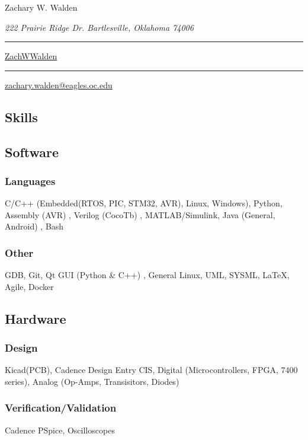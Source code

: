 \documentclass{article}
\newcommand\mybar{\kern1pt\rule[-\dp\strutbox]{.8pt}{\baselineskip}\kern1pt}
\begin{document}
\begin{center}
	\begin{Huge}
		Zachary W. Walden\\
	\end{Huge}
	\begin{large}
		\textsl{222 Prairie Ridge Dr. Bartlesville, Oklahoma 74006}\\
	\end{large}
	\begin{small}
		 \mybar { } \faGithub \href{https://github.com/ZachWWalden}{ ZachWWalden}
		\mybar { }\faEnvelope\href{mailto::zachary.walden@eagles.oc.edu}{ zachary.walden@eagles.oc.edu}
	\end{small}
\end{center}
\begin{spacing}{.5}
\section{Skills}
	\subsection{Software}
		\subsubsection{Languages} \small{C/C++} \scriptsize{(Embedded(RTOS, PIC, STM32, AVR), Linux, Windows)}\small{, Python, Assembly} \scriptsize{(AVR)} \small{, Verilog} \scriptsize{(CocoTb)} \small{, MATLAB/Simulink, Java} \scriptsize{(General, Android)} \small{, Bash}
		\subsubsection{Other} \small{GDB, Git, Qt GUI} \scriptsize{(Python \& C++)} \small{, General Linux, UML, SYSML, \LaTeX, Agile, Docker}
	\subsection{Hardware}
		\subsubsection{Design} \small{Kicad(PCB), Cadence Design Entry CIS, Digital} \scriptsize{(Microcontrollers, FPGA, 7400 series)}\small{, Analog} \scriptsize{(Op-Amps, Transisitors, Diodes)}
		\small{\subsubsection{Verification/Validation} Cadence PSpice, Oscilloscopes}

\end{spacing}
\end{document}

